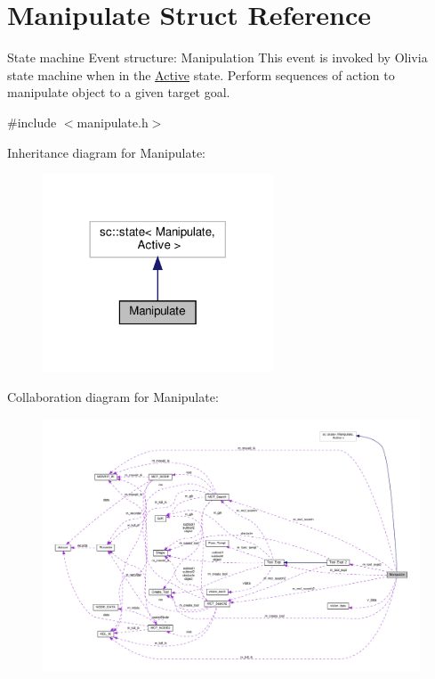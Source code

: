 \hypertarget{structManipulate}{}\section{Manipulate Struct Reference}
\label{structManipulate}


State machine Event structure\+: Manipulation This event is invoked by Olivia state machine when in the \hyperlink{structActive}{Active} state. Perform sequences of action to manipulate object to a given target goal.  




{\ttfamily \#include $<$manipulate.\+h$>$}



Inheritance diagram for Manipulate\+:
\nopagebreak
\begin{figure}[H]
\begin{center}
\leavevmode
\includegraphics[width=194pt]{structManipulate__inherit__graph}
\end{center}
\end{figure}


Collaboration diagram for Manipulate\+:
\nopagebreak
\begin{figure}[H]
\begin{center}
\leavevmode
\includegraphics[width=350pt]{structManipulate__coll__graph}
\end{center}
\end{figure}

